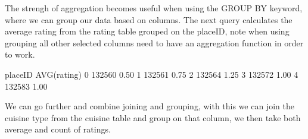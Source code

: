 \documentclass[letterpaper,10pt,english]{jupyterBook}
\begin{document}
\sphinxAtStartPar
The strengh of aggregation becomes useful when using the GROUP BY keyword, where we can group our data based on columns.
The next query calculates the average rating from the rating table grouped on the placeID, note when using grouping all other selected columns need to have an aggregation function in order to work.

\begin{sphinxVerbatim}[commandchars=\\\{\}]
  
\end{sphinxVerbatim}

\begin{sphinxVerbatim}[commandchars=\\\{\}]
   placeID  AVG(rating)
0   132560         0.50
1   132561         0.75
2   132564         1.25
3   132572         1.00
4   132583         1.00
\end{sphinxVerbatim}

\sphinxAtStartPar
We can go further and combine joining and grouping, with this we can join the cuisine type from the cuisine table and group on that column, we then take both average and count of ratings.

\begin{sphinxVerbatim}[commandchars=\\\{\}]
  
\end{sphinxVerbatim}
\end{document}
